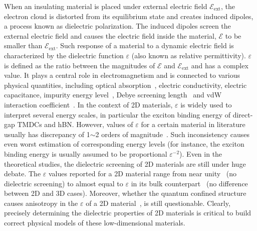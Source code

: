 When an insulating material is placed under external electric field
$\mathscr{E}_{\mathrm{ext}}$, the electron cloud is distorted from its
equilibrium state and creates induced dipoles, a process known as
dielectric polarization. The induced dipoles screen the external
electric field and causes the electric field inside the material,
$\mathscr{E}$ to be smaller than $\mathscr{E}_{\mathrm{ext}}$.
%
Such response of a material to a dynamic electric field is
characterized by the dielectric function $\varepsilon$ (also known as
relative permittivity).
%
$\varepsilon$ is defined as the ratio between the magnitudes of
$\mathscr{E}$ and $\mathscr{E}_{\mathrm{ext}}$ and has a complex value.
%
It plays a central role in electromagnetism and is connected to
various physical quantities, including optical
absorption~\autocite{Dressel_2001_electrodynamics}, electric conductivity,
electric capacitance, impurity energy level~\autocite{Ihn_2009_book},
Debye screening length~\autocite{Israelachvili_2011_book} and vdW
interaction coefficient~\parencite{parsegian_van_2010_book}.
%
In the context of 2D materials, $\varepsilon$ is widely used to
interpret several energy scales, in particular the exciton binding
energy of direct-gap TMDCs and hBN.
%
However, values of $\varepsilon$ for a certain material in literature
usually has discrepancy of 1$\sim{}$2 orders of
magnitude~\autocite{Li_2016_screening_rev}.
%
Such inconsistency causes even worst estimation of corresponding
energy levels (for instance, the exciton binding energy is usually
assumed to be proportional $\varepsilon^{-2}$).
%
Even in the theoretical studies, the dielectric screening of 2D
materials are still under huge debate.  The $\varepsilon$ values
reported for a 2D material range from near
unity~\autocite{Olsen_2016_hydrogen} (\ie no dielectric screening) to
almost equal to $\varepsilon$ in its bulk
counterpart~\autocite{Laturia_2018_2D_eps} (\ie no difference between 2D and 3D
cases).
%
Moreover, whether the quantum confined structure causes anisotropy in
the $\varepsilon$ of a 2D material~\autocite{Sohier_2016_2D_eps}, is still
questionable.
%
Clearly, precisely determining the dielectric properties of 2D
materials is critical to build correct physical models of these
low-dimensional materials.

